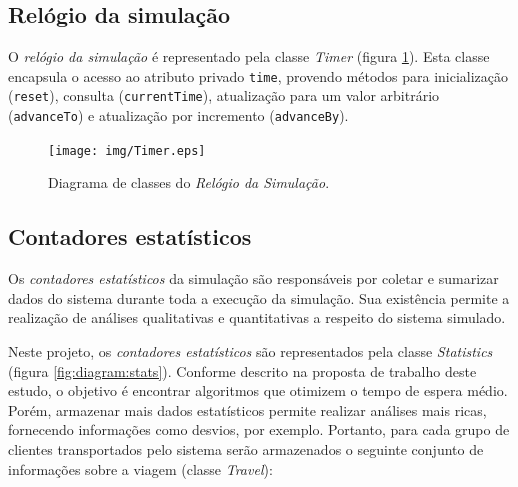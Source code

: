 \subsection{Relógio da simulação}

O \textit{relógio da simulação} é representado pela classe \textit{Timer}
(figura \ref{fig:diagram:timer}). Esta classe encapsula o acesso ao atributo
privado \texttt{time}, provendo métodos para inicialização (\texttt{reset}),
consulta (\texttt{currentTime}), atualização para um valor arbitrário
(\texttt{advanceTo}) e atualização por incremento (\texttt{advanceBy}).

\begin{figure}[htb!]
  \centering
  \texttt{[image: img/Timer.eps]}
  \caption{Diagrama de classes do \textit{Relógio da Simulação}.}
\label{fig:diagram:timer}
\end{figure}

\subsection{Contadores estatísticos}

Os \textit{contadores estatísticos} da simulação são responsáveis por coletar e
sumarizar dados do sistema durante toda a execução da simulação. Sua existência
permite a realização de análises qualitativas e quantitativas a respeito do
sistema simulado.

Neste projeto, os \textit{contadores estatísticos} são representados pela classe
\textit{Statistics} (figura \ref{fig:diagram:stats}). Conforme descrito na
proposta de trabalho deste estudo, o objetivo é encontrar algoritmos que
otimizem o tempo de espera médio. Porém, armazenar mais dados estatísticos
permite realizar análises mais ricas, fornecendo informações como desvios, por
exemplo. Portanto, para cada grupo de clientes transportados pelo sistema serão
armazenados o seguinte conjunto de informações sobre a viagem (classe
\textit{Travel}):

